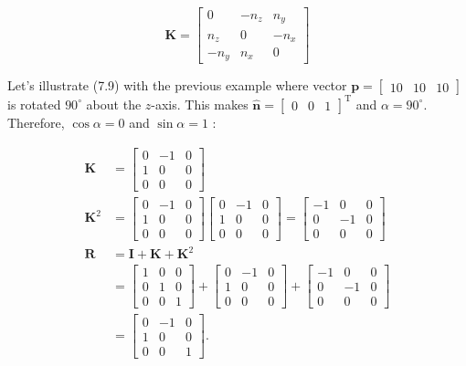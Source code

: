 \documentclass[10pt]{article}
\begin{document}
$$
\mathbf{K}=\left[\begin{array}{ccc}
0 & -n_{z} & n_{y} \\
n_{z} & 0 & -n_{x} \\
-n_{y} & n_{x} & 0
\end{array}\right]
$$

Let's illustrate (7.9) with the previous example where vector $\mathbf{p}=\left[\begin{array}{lll}10 & 10 & 10\end{array}\right]$ is rotated $90^{\circ}$ about the $z$-axis. This makes $\hat{\mathbf{n}}=\left[\begin{array}{lll}0 & 0 & 1\end{array}\right]^{\mathrm{T}}$ and $\alpha=90^{\circ}$. Therefore, $\cos \alpha=0$ and $\sin \alpha=1$ :

$$
\begin{aligned}
\mathbf{K} & =\left[\begin{array}{lcc}
0 & -1 & 0 \\
1 & 0 & 0 \\
0 & 0 & 0
\end{array}\right] \\
\mathbf{K}^{2} & =\left[\begin{array}{lll}
0 & -1 & 0 \\
1 & 0 & 0 \\
0 & 0 & 0
\end{array}\right]\left[\begin{array}{ccc}
0 & -1 & 0 \\
1 & 0 & 0 \\
0 & 0 & 0
\end{array}\right]=\left[\begin{array}{ccc}
-1 & 0 & 0 \\
0 & -1 & 0 \\
0 & 0 & 0
\end{array}\right] \\
\mathbf{R} & =\mathbf{I}+\mathbf{K}+\mathbf{K}^{2} \\
& =\left[\begin{array}{lll}
1 & 0 & 0 \\
0 & 1 & 0 \\
0 & 0 & 1
\end{array}\right]+\left[\begin{array}{lll}
0 & -1 & 0 \\
1 & 0 & 0 \\
0 & 0 & 0
\end{array}\right]+\left[\begin{array}{ccc}
-1 & 0 & 0 \\
0 & -1 & 0 \\
0 & 0 & 0
\end{array}\right] \\
& =\left[\begin{array}{lll}
0 & -1 & 0 \\
1 & 0 & 0 \\
0 & 0 & 1
\end{array}\right] .
\end{aligned}
$$
\end{document}
